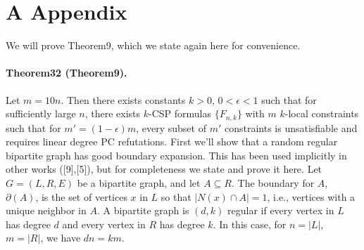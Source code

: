 \section*{A Appendix}
We will prove Theorem9, which we state again here for convenience.
\paragraph{Theorem32 (Theorem9).} Let $m=10n$. Then there exists constants $k>0$, $0<\epsilon<1$ such that for sufficiently large $n$, there exists $k$-CSP formulas $\{F_{n,k}\}$ with $m$ $k$-local constraints such that for $m'=(1-\epsilon)m$, every subset of $m'$ constraints is unsatisfiable and requires linear degree PC refutations.
First we'll show that a random regular bipartite graph has good boundary expansion. This has been used implicitly in other works ([9],[5]), but for completeness we state and prove it here. Let $G=(L,R,E)$ be a bipartite graph, and let $A\subseteq R$. The boundary for $A$, $\partial(A)$, is the set of vertices $x$ in $L$ so that $|N(x)\cap A|=1$, i.e., vertices with a unique neighbor in $A$. A bipartite graph is $(d,k)$ regular if every vertex in $L$ has degree $d$ and every vertex in $R$ has degree $k$. In this case, for $n=|L|$, $m=|R|$, we have $dn=km$.
